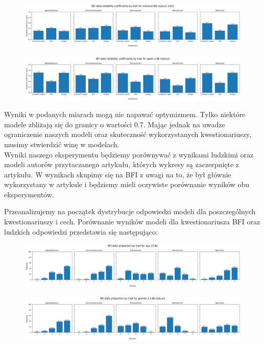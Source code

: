 \documentclass{article}
\begin{document}
\begin{figure}[H]
    \centering
    \includegraphics[width=0.7 \linewidth]{../Prompt_code/plots/ministral-8b-instruct-2410/bfi_reliability.png}
\end{figure}

\begin{figure}[H]
    \centering
    \includegraphics[width=0.7 \linewidth]{../Prompt_code/plots/qwen-3-8b-instruct/bfi_reliability.png}
\end{figure}

Wyniki w podanych miarach mogą nie napawać optymizmem. Tylko niektóre modele zbliżają się do granicy o wartości 0.7. Mając jednak na uwadze ograniczenie naszych modeli oraz skuteczność wykorzystanych kwestionariuszy, musimy stwierdzić winę w modelach. \\


Wyniki naszego eksperymentu będziemy porównywać z wynikami ludzkimi oraz modeli autorów przytaczanego artykułu, których wykresy są zaczerpnięte z artykułu. 
W wynikach skupimy się na BFI z uwagi na to, że był głównie wykorzystany w artykule i będziemy mieli oczywiste porównanie wyników obu eksperymentów.

Przeanalizujemy na początek dystrybucje odpowiedzi modeli dla poszczególnych kwestionariuszy i cech. Porównanie wyników modeli dla kwestionariusza BFI oraz ludzkich odpowiedzi przedstawia się następująco:

\begin{figure}[H]
    \centering
    \includegraphics[width=0.7 \linewidth]{../Prompt_code/plots/aya-23-8b/bfi_distribution.png}
\end{figure}

\begin{figure}[H]
    \centering
    \includegraphics[width=0.7 \linewidth]{../Prompt_code/plots/granite-3.3-8b-instruct/bfi_distribution.png}
\end{figure}
\end{document}
